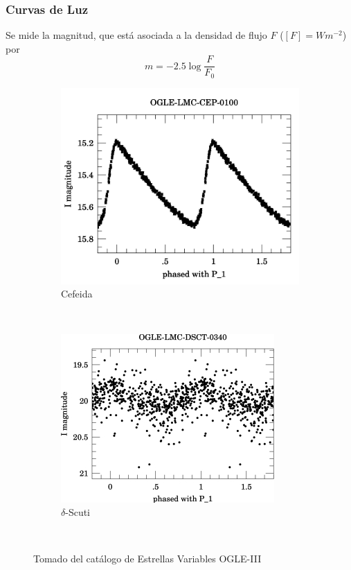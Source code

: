 \documentclass{beamer}
\begin{document}
\begin{frame}
  \frametitle{Curvas de Luz}
  Se mide la magnitud, que está asociada a la densidad de flujo $F$ ($[F] = Wm^{-2}$) por 
  \begin{equation}
    m = -2.5\log \frac{F}{F_0}
  \end{equation} 
  \begin{figure}
    \centering
    \begin{subfigure}[b]{0.4\textwidth}
      \includegraphics[width=\textwidth]{./img/OGLE-LMC-CEP-0100_1.png}
      \caption{Cefeida}
    \end{subfigure}%
    ~ %
    \begin{subfigure}[b]{0.4\textwidth}
      \includegraphics[width=\textwidth]{./img/OGLE-LMC-DSCT-0340_1.jpg}
      \caption{$\delta$-Scuti}
    \end{subfigure}
    ~ %
    \caption{Tomado del catálogo de Estrellas Variables OGLE-III}
  \end{figure}
\end{frame}
\end{document}
